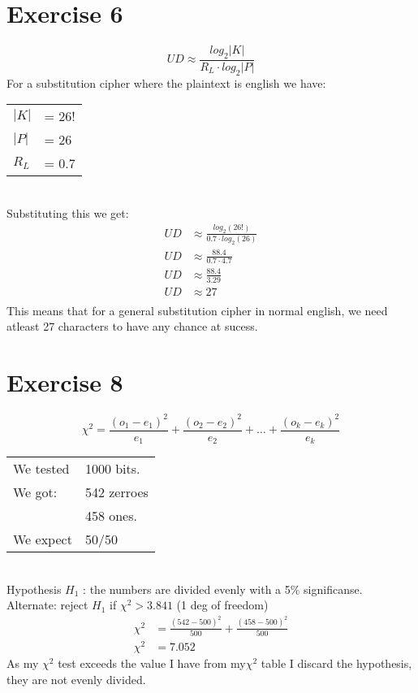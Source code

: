 \section{Exercise 6}
\begin{equation*}
UD \approx \frac{log_2|K|}{R_L\cdot log_2|P|}
\end{equation*}
For a substitution cipher where the plaintext is english we have:\\
\begin{tabular}{ll}
$|K|$ &= 26!\\
$|P|$ &= 26\\
$R_L$ &= 0.7
\end{tabular}\\
Substituting this we get:
\begin{equation*}
\begin{split}
UD &\approx \frac{log_2(26!)}{0.7\cdot log_2(26)}\\
UD &\approx \frac{88.4}{0.7\cdot 4.7}\\
UD &\approx \frac{88.4}{3.29}\\
UD &\approx 27\\
\end{split}
\end{equation*}
This means that for a general substitution cipher in normal english, we need
atleast 27 characters to have any chance at sucess.

\section{Exercise 8}
\begin{equation*}
\chi^2=\frac{(o_1-e_1)^2}{e_1} + \frac{(o_2-e_2)^2}{e_2} +
\ldots + \frac{(o_k-e_k)^2}{e_k}
\end{equation*}
\begin{tabular}{ll}
We tested &	1000 bits.\\
We got:   &	542 zerroes\\
		  &	458 ones.\\
We expect &	50/50
\end{tabular}\\
Hypothesis $H_1$ : the numbers are divided evenly with a 5\% significanse.\\
Alternate: reject $H_1$ if $\chi^2 > 3.841$ (1 deg of freedom)\\
\begin{equation*}
\begin{split}
\chi^2	&=\frac{(542-500)^2}{500} + \frac{(458-500)^2}{500}\\
\chi^2	&= 7.052
\end{split}
\end{equation*}
As my $\chi^2$ test exceeds the value I have from my$\chi^2$ table\cite{Prob} I
discard the hypothesis, they are not evenly divided.
